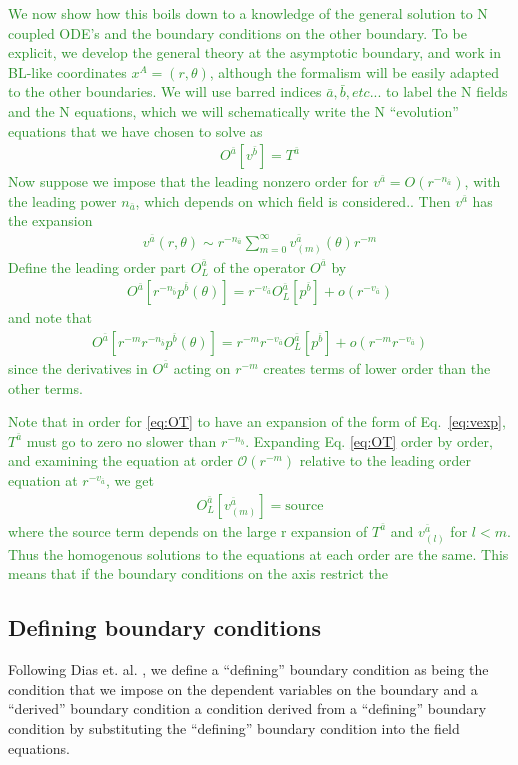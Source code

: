 \documentclass[aps,prd,amsmath,showpacs,amssymb,superscriptaddress,nofootinbib,longbibliography,eqsecnum,preprintnumbers]{revtex4-1}
\newcommand{\zach}[1]{\textcolor{ForestGreen}{#1}}
\begin{document}
\zach{We now show how this boils down to a knowledge of the general solution to N coupled ODE's and the boundary conditions on the other boundary. To be explicit, we develop the general theory at the asymptotic boundary, and work in BL-like coordinates $x^A=(r,\theta)$, although the formalism will be easily adapted to the other boundaries. We will use barred indices $\bar a, \bar b, etc...$ to label the N fields and the N equations, which we will schematically write the N ``evolution'' equations that we have chosen to solve as 
\begin{align}
O^{\bar a}[v^{\bar b}]=T^{\bar a} \label{eq:OT}
\end{align}
Now suppose we impose that the leading nonzero order for $v^{\bar a}=O(r^{-n_{\bar a}})$, with the leading power $n_{\bar a}$, which depends on which field is considered.. Then $v^{\bar a}$ has the expansion
\begin{align}
v^{\bar a}(r,\theta) \sim r^{-n_{\bar a}}\sum_{m=0}^\infty v^{\bar a}_{(m)}(\theta)r^{-m} \label{eq:vexp}
\end{align}
Define the leading order part $O^{\bar a}_L$ of the operator $O^{\bar a}$ by
\begin{align}
O^{\bar a}[r^{-n_{\bar b}}p^{\bar b}(\theta)]=r^{-v_{\bar a}}O^{\bar a}_L[p^{\bar b}] +o(r^{-v_{\bar a}})
\end{align}
and note that
\begin{align}
O^{\bar a}[r^{-m} r^{-n_{\bar b}}p^{\bar b}(\theta)]=r^{-m}r^{-v_{\bar a}}O^{\bar a}_L[p^{\bar b}] +o(r^{-m}r^{-v_{\bar a}})
\end{align}
since the derivatives in $O^{\bar a}$ acting on $r^{-m}$ creates terms of lower order than the other terms.} 

\zach{Note that in order for \eqref{eq:OT} to have an expansion of the form of Eq.~\eqref{eq:vexp}, $T^{\bar a}$ must go to zero no slower than $r^{-n_{\bar b}}$.
Expanding  Eq. \eqref{eq:OT} order by order, and examining the equation at order $\mathcal{O}(r^{-m})$ relative to the leading order equation at $r^{-v_{\bar a}}$, we get 
\begin{align}
O^{\bar a}_L[v_{(m)}^{\bar a}]= \text{source}
\end{align}
where the source term depends on the large r expansion of $T^{\bar a}$ and $v_{(l)}^{\bar a}$ for $l<m$. Thus the homogenous solutions to the equations at each order are the same. This means that if the boundary conditions on the axis restrict the}

\subsection{Defining boundary conditions}
Following Dias et. al. \cite{Dias:2015nua}, we define a ``defining'' boundary condition as being the condition that we impose on the dependent variables on the boundary and a ``derived'' boundary condition a condition derived from a ``defining'' boundary condition by substituting the ``defining'' boundary condition into the field equations. 
\end{document}
